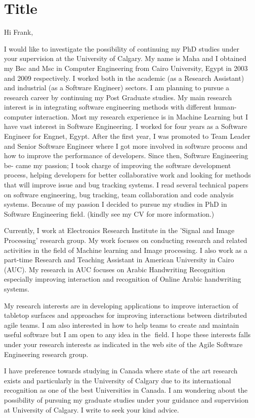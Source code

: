\documentclass{article}
\begin{document}
\section{Title}

Hi Frank,

I would like to investigate the possibility of continuing my PhD studies under your supervision at the University of Calgary. My name is Maha and I obtained my Bsc and Msc in Computer Engineering from Cairo University, Egypt in 2003 and 2009 respectively. I worked both in the academic (as a Research Assistant) and industrial (as a Software Engineer) sectors. I am planning to pursue a research career by continuing my Post Graduate studies. My main research interest is in integrating software engineering methods with different human-computer interaction.
Most my research experience is in Machine Learning but I have vast interest in Software Engineering. I worked for four years as a Software Engineer for Engnet, Egypt. After the first year, I was promoted to Team Leader and Senior Software Engineer where I got more involved in software process and how to improve the performance of developers. Since then, Software Engineering be- came my passion; I took charge of improving the software development process, helping developers for better collaborative work and looking for methods that will improve issue and bug tracking systems. I read several technical papers on software engineering, bug tracking, team collaboration and code analysis systems. Because of my passion I decided to pursue my studies in PhD in Software Engineering field. (kindly see my CV for more information.)

Currently, I work at Electronics Research Institute in the 'Signal and Image Processing' research group. My work focuses on conducting research and related activities in the field of Machine learning and Image processing. I also work as a part-time Research and Teaching Assistant in American University in Cairo (AUC). My research in AUC focuses on Arabic Handwriting Recognition especially improving interaction and recognition of Online Arabic handwriting systems.

My research interests are in developing applications to improve interaction of tabletop surfaces and approaches for improving interactions between distributed agile teams. I am also interested in how to help teams to create and maintain useful software but I am open to any idea in the field. I hope these interests falls under your research interests as indicated in the web site of the Agile Software Engineering research group.

I have preference towards studying in Canada where state of the art research exists and particularly in the University of Calgary due to its international recognition as one of the best Universities in Canada. I am wondering about the possibility of pursuing my graduate studies under your guidance and supervision at University of Calgary. I write to seek your kind advice.
\end{document}
